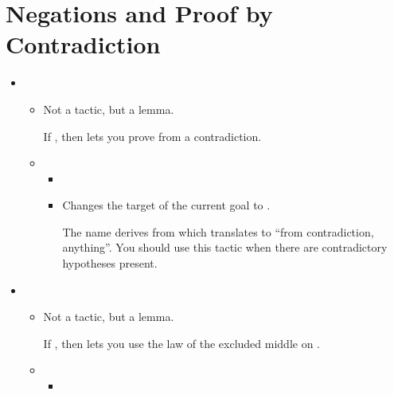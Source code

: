 \documentclass[letterpaper,10pt,english]{sphinxmanual}
\begin{document}
\section{Negations and Proof by Contradiction}
\label{\detokenize{tactics:negations-and-proof-by-contradiction}}\begin{itemize}
\item {} \begin{itemize}
\item {} 
\sphinxAtStartPar
{}
\sphinxhyphen{} Not a tactic, but a lemma.

\sphinxAtStartPar
If , then  lets you prove  from a contradiction.

\end{itemize}
\begin{itemize}
\item {} \begin{itemize}
\item {} 
\sphinxAtStartPar
{}

\item {} 
\sphinxAtStartPar
Changes the target of the current goal to .

\sphinxAtStartPar
The name derives from  which translates to “from contradiction, anything”.
You should use this tactic when there are contradictory hypotheses present.

\end{itemize}

\end{itemize}

\item {} \begin{itemize}
\item {} 
\sphinxAtStartPar
{}
\sphinxhyphen{} Not a tactic, but a lemma.

\sphinxAtStartPar
If , then  lets you use the law of the excluded middle on .

\end{itemize}
\begin{itemize}
\item {} \begin{itemize}
\item {} 
\sphinxAtStartPar
{}


\end{itemize}
\end{itemize}
\end{itemize}
\end{document}

